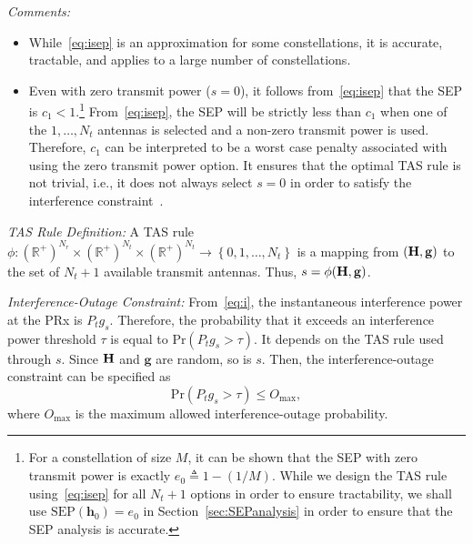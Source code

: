 \documentclass[12pt,draftcls,peerreview,onecolumn]{IEEEtran}
\newcommand{\brac}[1]{\left({#1}\right)}
\newcommand{\define}{\triangleq}
\newcommand{\ie}{{i.e.}}
\newcommand{\mtx}[1]{{\bf #1}} %
\newcommand{\prob}[1]{\text{Pr}\brac{#1}}
\newcommand{\SEP}{\text{SEP}}
\newcommand{\nx}{{0}}
\newcommand{\Nt}{{N_t}}
\newcommand{\Nr}{{N_r}}
\newcommand{\Pt}{{P_t}}
\newcommand{\such}{h}
\newcommand{\puch}{g}
\newcommand{\hk}[1]{{\such_{#1}}}
\newcommand{\gk}[1]{{\puch_{#1}}}
\newcommand{\h}{\mathbf{\such}}
\newcommand{\g}{\mathbf{\puch}}
\newcommand{\outmax}{O_{\text{max}}}
\newcommand{\itau}{\tau}
\newcommand{\cone}{c_{1}}
\newcommand{\allopts}{\left\{\nx,1,\ldots,\Nt\right\}}
\newcommand{\asrule}{\phi}
\newcommand{\zerosep}{e_0}
\newcommand{\Hmx}{\mtx{H}}
\begin{document}
{\em Comments:}
\begin{itemize}
\item While~\eqref{eq:isep} is an approximation for some constellations,  it is accurate, tractable, and applies to a large number of constellations. %

\item Even with zero transmit power ($s=\nx$), it follows from~\eqref{eq:isep} that the SEP is $\cone<1$.\footnote{For a constellation of size $M$, it can be shown that the SEP with zero transmit power is exactly $\zerosep\define 1-\left(1/M\right)$. While we design the TAS rule using~\eqref{eq:isep} for all $\Nt+1$ options in order to ensure tractability, we shall use $\SEP(\h_0) = \zerosep$ in Section~\ref{sec:SEPanalysis} in order to ensure that the SEP analysis is accurate.} From~\eqref{eq:isep}, the SEP will be strictly less than $\cone$ when one of the $1,\ldots,\Nt$ antennas is selected and a non-zero transmit power is used. Therefore, $\cone$ can be interpreted to be a worst case penalty associated with using the zero transmit power option. It ensures that the optimal TAS rule is not trivial, \ie, it does not always select $s=\nx$ in order to satisfy the interference constraint~\cite{Kashyap_2014_TCOM,Sarvendranath_2013_TCOM}. 	
\end{itemize}


{\em TAS Rule Definition:} A TAS rule $\asrule:\brac{\mathbb{R}^{+}}^{\Nr}\times\brac{\mathbb{R}^{+}}^{\Nt} \times \brac{\mathbb{R}^{+}}^{\Nt} \rightarrow \allopts$ is a mapping from $\left(\Hmx,\g\right)$ to the set of $\Nt+1$ available transmit antennas. Thus, $s = \phi(\Hmx,\g)$.

{\em Interference-Outage Constraint:}
From~\eqref{eq:i}, the instantaneous interference power at the PRx is $\Pt\gk{s}$. Therefore, the probability that it exceeds an interference power threshold $\itau$ is equal to $\prob{\Pt\gk{s}>\itau}$. It depends on the TAS rule used through $s$. Since $\Hmx$ and $\g$ are random, so is $s$. Then, the interference-outage constraint can be specified as 
\begin{equation}
\prob{\Pt\gk{s}>\itau} \leq \outmax,
\label{eq:iop_cons}
\end{equation}
where $\outmax$ is the maximum allowed interference-outage probability. 
\end{document}
